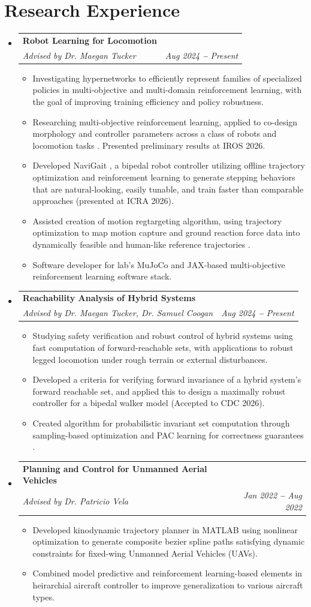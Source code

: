 \documentclass[letterpaper,11pt]{article}
\makeatletter
\newcommand{\resumeItem}[1]{
  \item\small{
    {#1 \vspace{-2pt}}
  }
}
\newcommand{\resumeSubheading}[4]{
  \vspace{-2pt}\item
    \begin{tabular*}{0.97\textwidth}[t]{l@{\extracolsep{\fill}}r}
      \textbf{#1} & #2 \\
      \textit{\small#3} & \textit{\small #4} \\
    \end{tabular*}\vspace{-7pt}
}
\newcommand{\resumeSubHeadingListStart}{\begin{itemize}[leftmargin=0.15in, label={}]}
\newcommand{\resumeSubHeadingListEnd}{\end{itemize}}
\newcommand{\resumeItemListStart}{\begin{itemize}}
\newcommand{\resumeItemListEnd}{\end{itemize}\vspace{-5pt}}
\makeatother
\begin{document}
\section{Research Experience}
  \vspace{3pt}
  \resumeSubHeadingListStart
    \resumeSubheading
      {Robot Learning for Locomotion}{}
      {Advised by Dr. Maegan Tucker}{Aug 2024 \textbf{--} Present}
      \resumeItemListStart
        \resumeItem{Investigating hypernetworks to efficiently represent families of specialized policies in multi-objective and multi-domain reinforcement learning, with the goal of improving training efficiency and policy robustness.}
        \resumeItem{Researching multi-objective reinforcement learning, applied to co-design morphology and controller parameters across a class of robots and locomotion tasks \cite{madabushi2026mocha}. Presented preliminary results at IROS 2026.}
        \resumeItem{Developed NaviGait \cite{janwani2026navigait}, a bipedal robot controller utilizing offline trajectory optimization and reinforcement learning to generate stepping behaviors that are 
        natural-looking, easily tunable, and train faster than comparable approaches (presented at ICRA 2026).}
        \resumeItem{Assisted creation of motion regtargeting algorithm, using trajectory optimization to map motion capture and ground reaction force data into
         dynamically feasible and human-like reference trajectories \cite{zhang2026kinodynamic}.}
        \resumeItem{Software developer for lab's MuJoCo and JAX-based multi-objective reinforcement learning software stack.}
      \resumeItemListEnd 
    \resumeSubheading
      {Reachability Analysis of Hybrid Systems}{}
      {Advised by Dr. Maegan Tucker, Dr. Samuel Coogan}{Aug 2024 \textbf{--} Present}
      \resumeItemListStart
        \resumeItem{Studying safety verification and robust control of hybrid systems using fast computation of forward-reachable sets, with applications to robust legged locomotion under rough terrain or external disturbances.}
        \resumeItem{Developed a criteria for verifying forward invariance of a hybrid system's forward reachable set, and applied this to design a maximally robust controller for a bipedal walker model \cite{madabushi2026differentiableinvariant} (Accepted to CDC 2026).}
        \resumeItem{Created algorithm for probabilistic invariant set computation through sampling-based optimization and PAC learning for correctness guarantees \cite{madabushi2026finitestep}.}
      \resumeItemListEnd 
    \resumeSubheading
      {Planning and Control for Unmanned Aerial Vehicles}{}
      {Advised by Dr. Patricio Vela}{Jan 2022 \textbf{--} Aug 2022}
      \resumeItemListStart
        \resumeItem{Developed kinodynamic trajectory planner in MATLAB using nonlinear optimization to generate composite bezier spline paths satisfying dynamic constraints for fixed-wing Unmanned Aerial Vehicles (UAVs).}
        \resumeItem{Combined model predictive and reinforcement learning-based elements in heirarchial aircraft controller to improve generalization to various aircraft types.}
      \resumeItemListEnd
  \resumeSubHeadingListEnd
\end{document}
